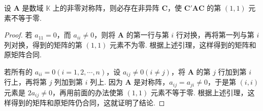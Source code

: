 \documentclass[../../main.tex]{subfiles}
\begin{document}
\begin{lemma}\label{lemma:非零对称阵合同于(1,1)元素不为零的矩阵}
设 $\boldsymbol{A}$ 是数域 $\mathbb{K}$ 上的非零对称阵，则必存在非异阵 $\boldsymbol{C}$，使 $\boldsymbol{C}'\boldsymbol{A}\boldsymbol{C}$ 的第 $(1,1)$ 元素不等于零.
\end{lemma}
\begin{proof}
若 $a_{11} = 0$，而 $a_{ii}\neq 0$，则将 $\boldsymbol{A}$ 的第一行与第 $i$ 行对换，再将第一列与第 $i$ 列对换，得到的矩阵的第 $(1,1)$ 元素不为零. 根据上述引理，这样得到的矩阵和原矩阵合同.

若所有的 $a_{ii}=0 (i = 1,2,\cdots,n)$，设 $a_{ij}\neq 0 (i\neq j)$，将 $\boldsymbol{A}$ 的第 $j$ 行加到第 $i$ 行上，再将第 $j$ 列加到第 $i$ 列上. 因为 $\boldsymbol{A}$ 是对称阵，$a_{ij}=a_{ji}\neq 0$，于是第 $(i,i)$ 元素是 $2a_{ij}\neq 0$，再用前面的办法使第 $(1,1)$ 元素不等于零. 根据上述引理，这样得到的矩阵和原矩阵仍合同，这就证明了结论. 

\end{proof}
\end{document}
